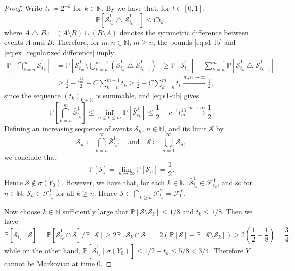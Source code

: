 \documentclass[12pt,oneside]{amsart}
\theoremstyle{definition}
\newcommand{\F}{\mathcal F}
\newcommand{\N}{\mathbb N}
\newcommand{\Sc}{\mathcal S}
\newcommand{\Sccc}{\bar{\mathcal S}}
\def\P{{\mathbb P}}
\numberwithin{equation}{section}
\begin{document}
\begin{proof}
	Write $t_k \coloneqq 2^{-k}$ for $k \in \N$. By  we have that,
	for $t \in [0, 1]$,
    \begin{equation}
        \label{eq:ex_regularized.difference}
        \P[\Sccc^1_{t_{k}} \bigtriangleup \Sccc^1_{t_{k + 1}}] \le C t_k,
    \end{equation}    
    where $A \bigtriangleup B \coloneqq (A \setminus B) \cup (B \setminus A)$ denotes the symmetric difference between events $A$ and $B$.
    Therefore, for $m,n \in \N$, $m \ge n$, the bounds \eqref{eq:s1-lb} and \eqref{eq:ex_regularized.difference} imply
    \begin{equation}
    \begin{split}
        \P\!\left[\bigcap_{k = n}^{m} \Sccc_{t_k}^1 \right]\! & = \P\!\left[\Sccc_{t_m}^1 \setminus \bigcup_{k = n}^{m - 1} (\Sccc_{t_k}^1 \bigtriangleup \Sccc_{t_{k + 1}}^1)\right]\! \geq \P[\Sccc_{t_m}^1] - \sum_{k = n}^{m-1}\P[\Sccc_{t_k}^1 \bigtriangleup \Sccc_{t_{k + 1}}^1]\\
        & \geq \frac12 - \frac{t_m^{12}}{2} - C\sum_{k = n}^{m - 1}t_k\ge \frac12 - C \sum_{k = n}^{m} t_k \xrightarrow{m, n \to \infty} \frac12,
    \end{split}
    \end{equation}
    since the sequence $(t_k)_{k \in \N}$ is summable, and \eqref{eq:s1-ub} gives
    \begin{equation}
    	\P\!\left[\bigcap_{k = n}^{m} \Sccc_{t_k}^1 \right]\! \leq \inf_{n \leq k \leq m} \P[\Sccc^1_{t_k}] \leq \frac12 + c^{-1} t_m^{13} \xrightarrow{m \to \infty} \frac12.
    \end{equation}
    Defining an increasing sequence of events $\Sc_n$, $n \in \N$, and its limit $\Sc$ by
    \begin{equation}
        \Sc_n \coloneqq \bigcap_{k = n}^\infty \Sccc_{t_k}^1, \quad \text{and} \quad \Sc \coloneqq \bigcup_{n = 1}^\infty \Sc_n,
    \end{equation}
    we conclude that
    \begin{equation}
    	\P[\Sc] = \lim_{n \to \infty} \P[\Sc_n] = \frac{1}{2}.
    \end{equation}
    Hence $\Sc \notin \sigma(Y_0)$. However, we have that, for each $k \in \N$, $\Sccc^1_{t_k} \in \F^Y_{t_k}$, and so for $n \in \N$, $\Sc_n \in \F^Y_{t_k}$ for all $k \geq n$. Hence $\Sc \in \bigcap_{k \geq n} \F^Y_{t_k} = \F^Y_0$.
    
    Now choose $k \in \N$ sufficiently large that $\P[\Sc \setminus \Sc_k] \le 1/8$ and $t_k \leq 1/8$.
    Then we have
    \begin{equation}
    	\P[\Sccc^1_{t_k} \mid \Sc] = \P[\Sccc^1_{t_k} \cap \Sc]/\P[\Sc] \geq  2 \P[\Sc_k \cap \Sc] = 2(\P[\Sc] - \P[\Sc \setminus \Sc_k]) \geq 2\!\left(\frac12 - \frac18\right)\! = \frac34,
    \end{equation}
    while on the other hand, $\P[\Sccc^1_{t_k} \mid \sigma(Y_0)] \leq 1/2 + t_k \leq 5/8 < 3/4$. Therefore $Y$ cannot be Markovian at time $0$.
    

\end{proof}
\end{document}
